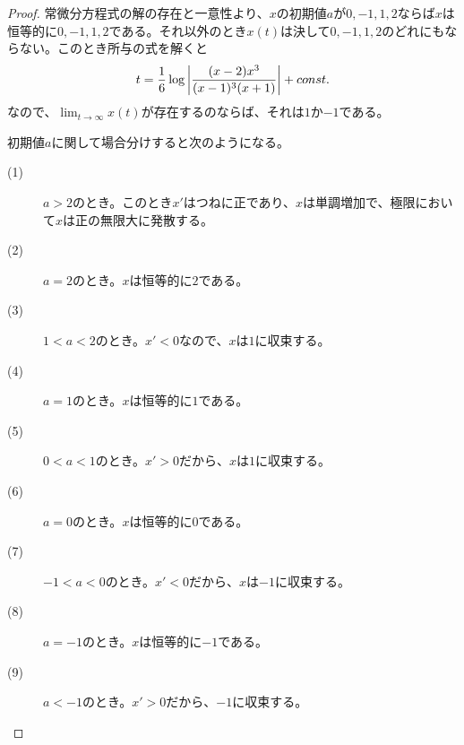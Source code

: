 \subsubsection{}%
\begin{proof}
  常微分方程式の解の存在と一意性より、$x$の初期値$a$が$0,-1,1,2$ならば$x$は恒等的に$0,-1,1,2$である。それ以外のとき$x(t)$は決して$0,-1,1,2$のどれにもならない。このとき所与の式を解くと
  \[
  t = \frac{1}{6} \log \left \lvert  \frac{(x-2)x^3 }{(x-1)^3 (x+1)}  \right \rvert + const.
  \]
  なので、$\lim_{t\to \infty} x(t)$が存在するのならば、それは$1$か$-1$である。

  初期値$a$に関して場合分けすると次のようになる。
  \begin{description}
    \item[(1)] $a>2$のとき。このとき$x'$はつねに正であり、$x$は単調増加で、極限において$x$は正の無限大に発散する。
    \item[(2)] $a=2$のとき。$x$は恒等的に$2$である。
    \item[(3)] $1<a<2$のとき。$x' < 0$なので、$x$は$1$に収束する。
    \item[(4)] $a=1$のとき。$x$は恒等的に$1$である。
    \item[(5)] $0<a<1$のとき。$x'>0$だから、$x$は$1$に収束する。
    \item[(6)] $a=0$のとき。$x$は恒等的に$0$である。
    \item[(7)] $-1<a<0$のとき。$x' < 0$だから、$x$は$-1$に収束する。
    \item[(8)] $a=-1$のとき。$x$は恒等的に$-1$である。
    \item[(9)] $a<-1$のとき。$x'>0$だから、$-1$に収束する。
  \end{description}
\end{proof}
